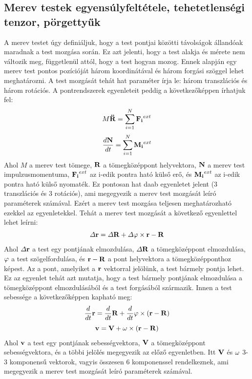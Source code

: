 \documentclass[../main.tex]{subfiles}
\begin{document}
\subsection{Merev testek egyensúlyfeltétele, tehetetlenségi tenzor, pörgettyűk}
A merev testet úgy definiáljuk, hogy a test pontjai közötti távolságok állandóak maradnak a test mozgása során. Ez azt jelenti, hogy a test alakja és mérete nem változik meg, függetlenül attól, hogy a test hogyan mozog.
Ennek alapján egy merev test pontos pozícióját három koordinátával és három forgási szöggel lehet meghatározni. A test mozgását tehát hat paraméter írja le: három transzlációs és három rotációs.
A pontrendszerek egyenleteit peddig a következőképpen írhatjuk fel:
\begin{equation}
    M \bold{\ddot{R}} = \sum_{i=1}^{N} \bold{F_i}^{ext}
\end{equation}
\begin{equation}
    \frac{d\bold{N}}{dt} = \sum_{i=1}^{N} \bold{M_i}^{ext}
\end{equation}
Ahol $M$ a merev test tömege, $\bold{R}$ a tömegközéppont helyvektora, $\bold{N}$ a merev test impulzusmomentuma, $\bold{F_i}^{ext}$ az i-edik pontra ható külső erő, és $\bold{M_i}^{ext}$ az i-edik pontra ható külső nyomaték.
Ez pontosan hat daab egyenletet jelent (3 transzlációs és 3 rotációs), ami megegyezik a merev test mozgását leíró paraméterek számával. Ezért a merev test mozgása teljesen meghatározható ezekkel az egyenletekkel.
Tehát a merev test mozgását a következő egyenlettel lehet leírni:
\begin{equation}
    \varDelta \bold{r} = \varDelta \bold{R} + \varDelta \bold{\varphi} \times \bold{\bold{r} - \bold{R}}
\end{equation}
Ahol $\varDelta \bold{r}$ a test egy pontjának elmozdulása, $\varDelta \bold{R}$ a tömegközéppont elmozdulása, $\bold{\varphi}$ a test szögelfordulása, és $\bold{r} - \bold{R}$ a pont helyvektora a tömegközépponthoz képest.
Az a pont, amelyiket a $\bold{r}$ vektorral jelölünk, a test bármely pontja lehet. Ez az egyenlet tehát azt mutatja, hogy a test bármely pontjának elmozdulása a tömegközéppont elmozdulásából és a test forgásából származik. 
Innen a test sebessége a következőképpen kapható meg:
\begin{equation}
    \frac{d}{dt}\bold{r} = \frac{d}{dt}\bold{R} + \frac{d}{dt}\bold{\varphi} \times (\bold{r} - \bold{R})
\end{equation}
\begin{equation}
    \bold{v} = \bold{V} + \bold{\omega} \times (\bold{r} - \bold{R})
\end{equation}
Ahol $\bold{v}$ a test egy pontjának sebességvektora, $\bold{V}$ a tömegközéppont sebességvektora, és a többi jelölés megegyezik az előző egyenletben. Itt $\bold{V}$ és $\bold{\omega}$ 3-3 komponensű vektorok, vagyis összesen 6 komponenssel rendelkeznek, ami megegyezik a merev test mozgását leíró paraméterek számával. 
\end{document}
